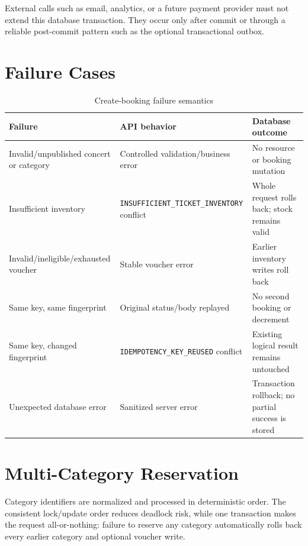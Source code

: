 External calls such as email, analytics, or a future payment provider must not
extend this database transaction. They occur only after commit or through a
reliable post-commit pattern such as the optional transactional outbox.

\section{Failure Cases}
\begin{table}[H]
\centering
\scriptsize
\caption{Create-booking failure semantics}
\begin{tabularx}{\textwidth}{p{}p{}Y}
\toprule
\textbf{Failure} & \textbf{API behavior} & \textbf{Database outcome} \\
\midrule
Invalid/unpublished concert or category & Controlled validation/business error & No resource or booking mutation \\
Insufficient inventory & \nolinkurl{INSUFFICIENT_TICKET_INVENTORY} conflict & Whole request rolls back; stock remains valid \\
Invalid/ineligible/exhausted voucher & Stable voucher error & Earlier inventory writes roll back \\
Same key, same fingerprint & Original status/body replayed & No second booking or decrement \\
Same key, changed fingerprint & \nolinkurl{IDEMPOTENCY_KEY_REUSED} conflict & Existing logical result remains untouched \\
Unexpected database error & Sanitized server error & Transaction rollback; no partial success is stored \\
\bottomrule
\end{tabularx}
\end{table}

\section{Multi-Category Reservation}
Category identifiers are normalized and processed in deterministic order. The
consistent lock/update order reduces deadlock risk, while one transaction makes
the request all-or-nothing: failure to reserve any category automatically
rolls back every earlier category and optional voucher write.
